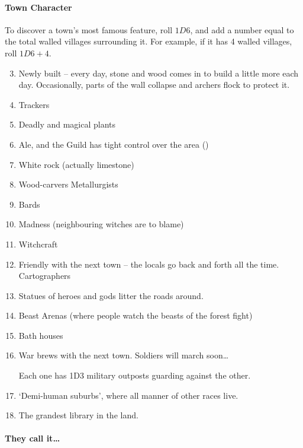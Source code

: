 \begin{multicols}{2}
\paragraph{Town Character}
\label{mapCharacter}

To discover a town's most famous feature, roll $1D6$, and add a number equal to the total walled villages surrounding it.
For example, if it has 4 walled villages, roll $1D6+4$.

\begin{enumerate}
\setcounter{enumi}{2}
  \item
  Newly built -- every day, stone and wood comes in to build a little more each day.
  Occasionally, parts of the wall collapse and archers flock to protect it.
  \item
  Trackers
  \item
  Deadly and magical plants
  \item
  Ale, and the Guild has tight control over the area ()
  \item
  White rock (actually limestone)
  \item
  \ifodd\value{r4}
    Wood-carvers
  \else
    Metallurgists
  \fi
  \item
 Bards
  \item
  Madness (neighbouring witches are to blame)
  \item
  Witchcraft
  \item
  \ifodd\value{r4}
  Friendly with the next town -- the locals go back and forth all the
    time.
  \else
    Cartographers
  \fi
  \item
  Statues of heroes and gods litter the roads around.
  \item
  Beast Arenas (where people watch the beasts of the forest fight)
  \item
  Bath houses
  \item
  War brews with the next town.
  Soldiers will march soon\ldots

  Each one has 1D3 military outposts guarding against the other.
  \item
  `Demi-human suburbs', where all manner of other races live.
  \item
  The grandest library in the land.
\end{enumerate}

\paragraph{They call it\ldots{}}


\end{multicols}
